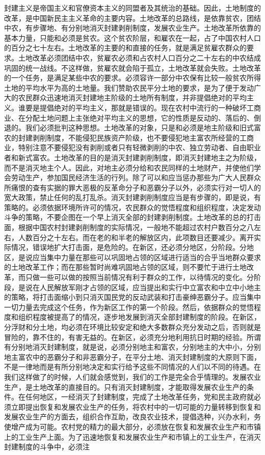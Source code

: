 封建主义是帝国主义和官僚资本主义的同盟者及其统治的基础。因此，土地制度的改革，是中国新民主主义革命的主要内容。土地改革的总路线，是依靠贫农，团结中农，有步骤地、有分别地消灭封建剥削制度，发展农业生产。土地改革所依靠的基本力量，只能和必须是贫农。这个贫农阶层，和雇农在一起，占了中国农村人口的百分之七十左右。土地改革的主要的和直接的任务，就是满足贫雇农群众的要求。土地改革必须团结中农，贫雇农必须和占农村人口百分之二十左右的中农结成巩固的统一战线。不这样做，贫雇农就会陷于孤立，土地改革就会失败。土地改革的一个任务，是满足某些中农的要求。必须容许一部分中农保有比较一般贫农所得土地的平均水平为高的土地量。我们赞助农民平分土地的要求，是为了便于发动广大的农民群众迅速地消灭封建地主阶级的土地所有制度，并非提倡绝对的平均主义。谁要是提倡绝对的平均主义，那就是错误的。现在农村中流行的一种破坏工商业、在分配土地问题上主张绝对平均主义的思想，它的性质是反动的、落后的、倒退的。我们必须批判这种思想。土地改革的对象，只是和必须是地主阶级和旧式富农的封建剥削制度，不能侵犯民族资产阶级，也不要侵犯地主富农所经营的工商业，特别注意不要侵犯没有剥削或者只有轻微剥削的中农、独立劳动者、自由职业者和新式富农。土地改革的目的是消灭封建剥削制度，即消灭封建地主之为阶级，而不是消灭地主个人。因此，对地主必须分给和农民同样的土地财产，并使他们学会劳动生产，参加国民经济生活的行列。除了可以和应当惩办那些为广大人民群众所痛恨的查有实据的罪大恶极的反革命分子和恶霸分子以外，必须实行对一切人的宽大政策，禁止任何的乱打乱杀。消灭封建剥削制度应当是有步骤的，即是说，有策略的。必须依据环境所许可的情况，农民群众的觉悟程度和组织程度，决定发动斗争的策略，不要企图在一个早上消灭全部的封建剥削制度。土地改革的总的打击面，根据中国农村封建剥削制度的实际情况，一般地不能超过农村户数百分之八左右，人数百分之十左右。而在老的和半老的解放区内，此项数目还要减少。离开实际情况，错误地扩大打击面，是危险的。在新区，还必须分地区，分阶段。分地区，是说应当集中力量在那些可以巩固地占领的区域进行适当的合乎当地群众要求的土地改革工作；而在那些暂时尚难巩固地占领的区域，则不要忙于进行土地改革，而只做一些可以做的按照当前情况有利于群众的工作，以待情况的变化。分阶段，是说在人民解放军刚才占领的区域，应当提出和实行中立富农和中立中小地主的策略，将打击面缩小到只消灭国民党的反动武装和打击豪绅恶霸分子。应当集中一切力量去完成这个任务，作为新区工作的第一个阶段。然后，依据群众的觉悟程度和组织程度被提高了的情况，逐步地发展到消灭全部封建制度的阶段。在新区，分浮财和分土地，均必须在环境比较安定和绝大多数群众充分发动之后，否则就是冒险的，靠不住的，有害无益的。在新区，必须充分地利用抗日时期的经验。所谓有分别地消灭封建制度，就是说，必须分别地主和富农，分别地主的大中小，分别地主富农中的恶霸分子和非恶霸分子，在平分土地、消灭封建制度的大原则下面，不是一律地而是有所分别地决定和实行给予这些不同情况的人们以不同的待遇。在我们这样做了的时候，人们就会感觉到，我们的工作是完全合乎情理的。发展农业生产，是土地改革的直接目的。只有消灭封建制度，才能取得发展农业生产的条件。在任何地区，一经消灭了封建制度，完成了土地改革任务，党和民主政府就必须立即提出恢复和发展农业生产的任务，将农村中的一切可能的力量转移到恢复和发展农业生产的方面去，组织合作互助，改良农业技术，提倡选种，兴办水利，务使增产成为可能。农村党的精力的最大部分，必须放在恢复和发展农业生产和市镇上的工业生产上面。为了迅速地恢复和发展农业生产和市镇上的工业生产，在消灭封建制度的斗争中，必须注